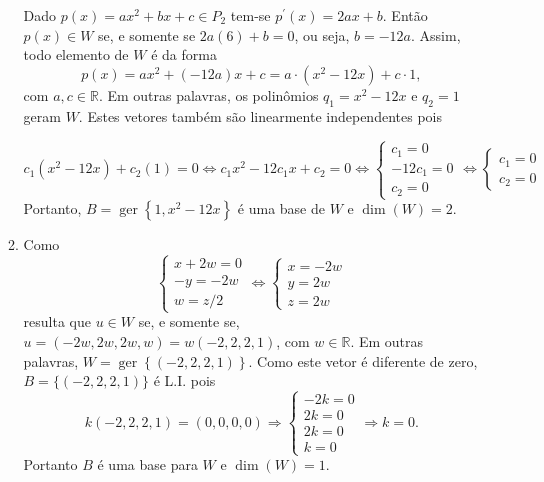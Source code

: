 \documentclass[12pt,a4paper]{article}
\newcommand*\ger[1]{\operatorname{ger}\left\{#1\right\}}
\newcommand*\R{\mathbb{R}}
\begin{document}
\begin{enumerate}
\begin{enumerate}
Dado $p(x) = ax^2+bx+c \in P_2$ tem-se $p^\prime(x) = 2ax + b$. Então $p(x) \in W$ se, e somente se $2a(6) + b = 0$, ou seja, $b = -12a$. Assim, todo elemento de $W$ é da forma
\[
p(x)
= ax^2 + (-12a)x + c
= a \cdot (x^2 -12x) + c \cdot 1,
\]
com $a,c \in \R$. Em outras palavras, os polinômios $q_1 = x^2 -12x$ e $q_2 = 1$ geram $W$. Estes vetores também são linearmente independentes pois

$
c_1(x^2 -12x) + c_2(1) = 0
\Leftrightarrow
c_1x^2 -12 c_1 x + c_2 = 0
\Leftrightarrow
\begin{cases}
    c_1 = 0\\
-12 c_1 = 0\\
    c_2 = 0
\end{cases}
\Leftrightarrow
\begin{cases}
c_1 = 0\\
c_2 = 0
\end{cases}
$
Portanto, $B = \ger{1, x^2 - 12x}$ é uma base de $W$ e $\dim(W) = 2$.

\item Como
\[
\begin{cases}
x +  2w = 0\\
  -y    = -2w\\
      w = z/2
\end{cases}
\Leftrightarrow
\begin{cases}
x = -2w\\
y = 2w\\
z = 2w
\end{cases}
\]
resulta que $u \in W$ se, e somente se, $u = (-2w,2w,2w,w) = w (-2,2,2,1)$, com $w \in \R$. Em outras palavras, $W = \ger{ (-2,2,2,1) }$. Como este vetor é diferente de zero, $B = \{ (-2,2,2,1) \}$ é L.I. pois
\[
k (-2,2,2,1) = (0,0,0,0)
\Rightarrow
\begin{cases}
-2k = 0\\
2k = 0\\
2k = 0\\
k = 0
\end{cases}
\Rightarrow k = 0.
\]
Portanto $B$ é uma base para $W$ e $\dim(W) = 1$.
\end{enumerate}


\end{enumerate}
\end{document}
